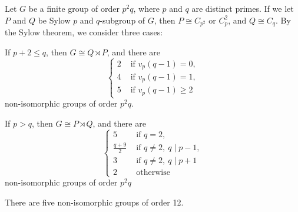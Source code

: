 \documentclass{../../large}
\begin{document}
\begin{prb}
Let $G$ be a finite group of order $p^2q$, where $p$ and $q$ are distinct primes.
If we let $P$ and $Q$ be Sylow $p$ and $q$-subgroup of $G$, then $P\cong C_{p^2}\text{ or }C_p^2$, and $Q\cong C_q$.
By the Sylow theorem, we consider three cases:
\begin{parts}
\item If $p+2\le q$, then $G\cong Q\rtimes P$, and there are
\[\begin{cases}
2&\text{ if }v_p(q-1)=0,\\
4&\text{ if }v_p(q-1)=1,\\
5&\text{ if }v_p(q-1)\ge2
\end{cases}\]
non-isomorphic groups of order $p^2q$.
\item If $p>q$, then $G\cong P\rtimes Q$, and there are
\[\begin{cases}
5&\text{ if }q=2,\\
\frac{q+9}2&\text{ if }q\ne2,\ q\mid p-1,\\
3&\text{ if }q\ne2,\ q\mid p+1\\
2&\text{ otherwise }
\end{cases}\]
non-isomorphic groups of order $p^2q$
\item There are five non-isomorphic groups of order 12.
\end{parts}
\end{prb}
\end{document}
